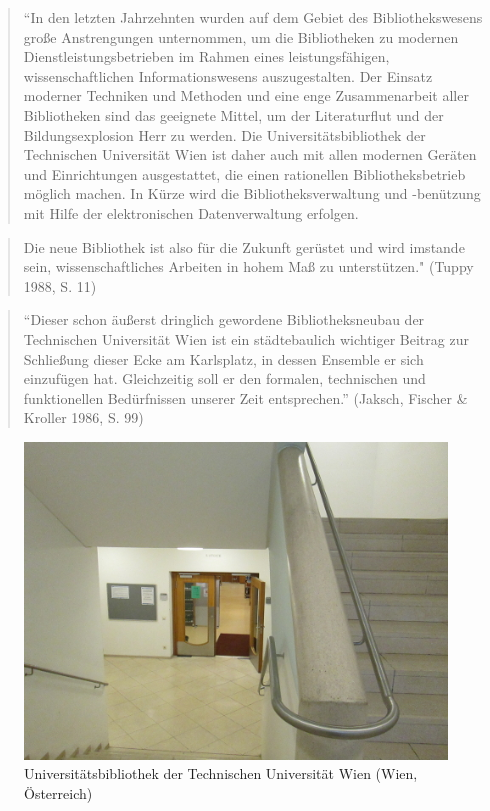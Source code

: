 \documentclass[a4paper,
fontsize=11pt,
oneside,
numbers=noperiodatend,
parskip=half-,
bibliography=totoc,
final
]{scrartcl}
\begin{document}
\begin{quote}
``In den letzten Jahrzehnten wurden auf dem Gebiet des Bibliothekswesens
große Anstrengungen unternommen, um die Bibliotheken zu modernen
Dienstleistungsbetrieben im Rahmen eines leistungsfähigen,
wissenschaftlichen Informationswesens auszugestalten. Der Einsatz
moderner Techniken und Methoden und eine enge Zusammenarbeit aller
Bibliotheken sind das geeignete Mittel, um der Literaturflut und der
Bildungsexplosion Herr zu werden. Die Universitätsbibliothek der
Technischen Universität Wien ist daher auch mit allen modernen Geräten
und Einrichtungen ausgestattet, die einen rationellen Bibliotheksbetrieb
möglich machen. In Kürze wird die Bibliotheksverwaltung und -benützung
mit Hilfe der elektronischen Datenverwaltung erfolgen.
\end{quote}

\begin{quote}
Die neue Bibliothek ist also für die Zukunft gerüstet und wird imstande
sein, wissenschaftliches Arbeiten in hohem Maß zu unterstützen." (Tuppy
1988, S. 11)
\end{quote}

\begin{quote}
\enquote{Dieser schon äußerst dringlich gewordene Bibliotheksneubau der
Technischen Universität Wien ist ein städtebaulich wichtiger Beitrag zur
Schließung dieser Ecke am Karlsplatz, in dessen Ensemble er sich
einzufügen hat. Gleichzeitig soll er den formalen, technischen und
funktionellen Bedürfnissen unserer Zeit entsprechen.} (Jaksch, Fischer
\& Kroller 1986, S. 99)
\end{quote}

\begin{figure}[htbp]
\centering
\includegraphics{./img/042.jpg}
\caption{Universitätsbibliothek der Technischen Universität Wien
(Wien,
Österreich)}
\end{figure}
\end{document}
